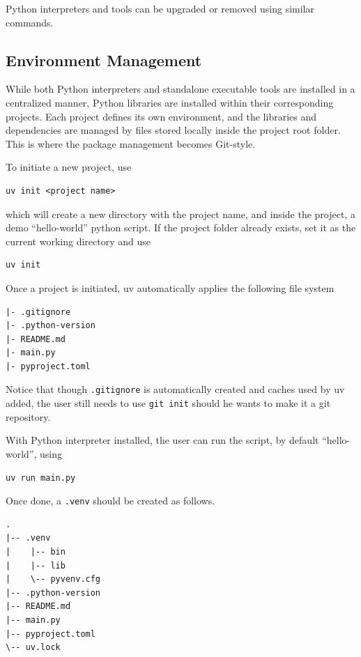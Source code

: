 Python interpreters and tools can be upgraded or removed using similar commands.

\subsection{Environment Management}

While both Python interpreters and standalone executable tools are installed in a centralized manner, Python libraries are installed within their corresponding projects. Each project defines its own environment, and the libraries and dependencies are managed by files stored locally inside the project root folder. This is where the package management becomes Git-style.

To initiate a new project, use
\begin{lstlisting}
uv init <project name>
\end{lstlisting}
which will create a new directory with the project name, and inside the project, a demo ``hello-world'' python script. If the project folder already exists, set it as the current working directory and use
\begin{lstlisting}
uv init
\end{lstlisting}

Once a project is initiated, uv automatically applies the following file system
\begin{lstlisting}
|- .gitignore
|- .python-version
|- README.md
|- main.py
|- pyproject.toml
\end{lstlisting}

Notice that though \verb|.gitignore| is automatically created and caches used by uv added, the user still needs to use \verb|git init| should he wants to make it a git repository.

With Python interpreter installed, the user can run the script, by default ``hello-world'', using
\begin{lstlisting}
uv run main.py
\end{lstlisting}
Once done, a \verb|.venv| should be created as follows.
\begin{lstlisting}
.
|-- .venv
|    |-- bin
|    |-- lib
|    \-- pyvenv.cfg
|-- .python-version
|-- README.md
|-- main.py
|-- pyproject.toml
\-- uv.lock
\end{lstlisting}

